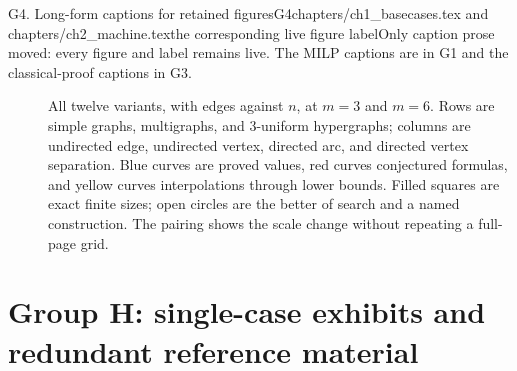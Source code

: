 \begin{offcut}{G4. Long-form captions for retained figures}{G4}{chapters/ch1\_basecases.tex and chapters/ch2\_machine.tex}{the corresponding live figure label}{Only caption prose moved: every figure and label remains live. The MILP captions are in G1 and the classical-proof captions in G3.}
\begin{description}
\item[]
All twelve variants, with edges against $n$, at $m=3$ and $m=6$. Rows are simple graphs, multigraphs, and $3$-uniform hypergraphs; columns are undirected edge, undirected vertex, directed arc, and directed vertex separation. Blue curves are proved values, red curves conjectured formulas, and yellow curves interpolations through lower bounds. Filled squares are exact finite sizes; open circles are the better of search and a named construction. The pairing shows the scale change without repeating a full-page grid.
\end{description}
\end{offcut}


\clearpage
\section*{Group H: single-case exhibits and redundant reference material}

